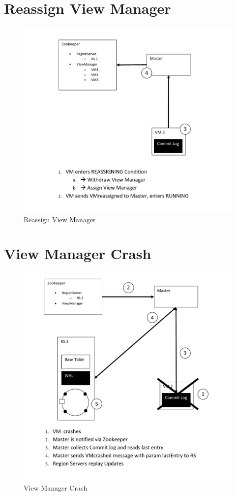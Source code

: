 \section{Reassign View Manager}
\begin{figure}[h!]
  \centering
    \includegraphics[scale=0.8]{figures/SO_ReassignViewManager}
     \caption{Reassign View Manager}
    \label{fig:reassignviewmanager}
\end{figure}

\newpage

\section{View Manager Crash}
\begin{figure}[h!]
  \centering
    \includegraphics[scale=0.8]{figures/SO_ViewManagerCrash}
     \caption{View Manager Crash}
    \label{fig:so_viewmanagercrash}
\end{figure}
\newpage


